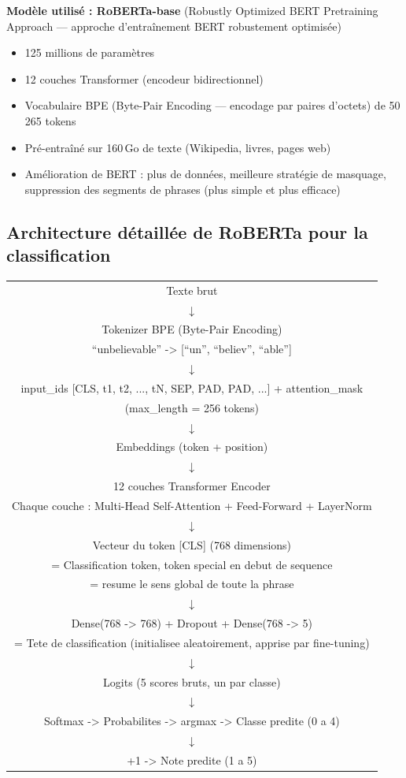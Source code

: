 \documentclass[12pt, a4paper]{article}
\begin{document}
\textbf{Modèle utilisé : RoBERTa-base}
(Robustly Optimized BERT Pretraining Approach — approche d'entraînement BERT robustement optimisée)
\begin{itemize}
  \item 125 millions de paramètres
  \item 12 couches Transformer (encodeur bidirectionnel)
  \item Vocabulaire BPE (Byte-Pair Encoding — encodage par paires d'octets) de 50\,265 tokens
  \item Pré-entraîné sur 160\,Go de texte (Wikipedia, livres, pages web)
  \item Amélioration de BERT : plus de données, meilleure stratégie de masquage,
        suppression des segments de phrases (plus simple et plus efficace)
\end{itemize}

\subsection{Architecture détaillée de RoBERTa pour la classification}

\begin{center}
\ttfamily\small
\begin{tabular}{c}
Texte brut \\
$\downarrow$ \\
Tokenizer BPE (Byte-Pair Encoding) \\
``unbelievable'' -> [``un'', ``believ'', ``able''] \\
$\downarrow$ \\
input\_ids [CLS, t1, t2, ..., tN, SEP, PAD, PAD, ...] + attention\_mask \\
(max\_length = 256 tokens) \\
$\downarrow$ \\
Embeddings (token + position) \\
$\downarrow$ \\
12 couches Transformer Encoder \\
Chaque couche : Multi-Head Self-Attention + Feed-Forward + LayerNorm \\
$\downarrow$ \\
Vecteur du token [CLS] (768 dimensions) \\
[CLS] = Classification token, token special en debut de sequence \\
      = resume le sens global de toute la phrase \\
$\downarrow$ \\
Dense(768 -> 768) + Dropout + Dense(768 -> 5) \\
= Tete de classification (initialisee aleatoirement, apprise par fine-tuning) \\
$\downarrow$ \\
Logits (5 scores bruts, un par classe) \\
$\downarrow$ \\
Softmax -> Probabilites -> argmax -> Classe predite (0 a 4) \\
$\downarrow$ \\
+1 -> Note predite (1 a 5) \\
\end{tabular}
\end{center}
\end{document}
